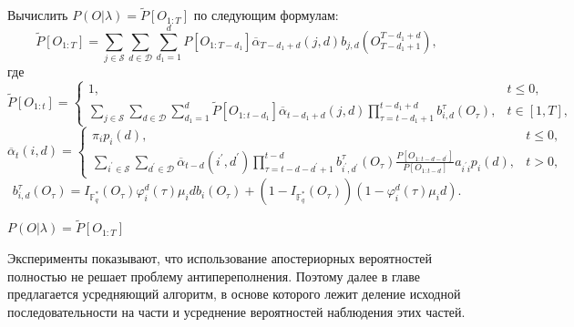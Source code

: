 \documentclass[twoside,12pt]{article}
\begin{document}
\begin{algorithm}[H]
\SetAlgoLined
\caption{${\mathrm{EvaluationProblemSolver}}$}

Вычислить $P(O|\lambda) = \widetilde{P}[O_{1:T}]$ по следующим формулам:
\begin{equation}\nonumber
\widetilde{P}[O_{1:T}]=\sum\limits_{j\in \mathcal{S}}\sum\limits_{d \in \mathcal{D}}\sum\limits_{d_1=1}^{d}P[O_{1:T-d_1}]\overline{\alpha}_{T-d_1+d}(j,d)b_{j,d}(O_{T-d_1+1}^{T-d_1+d}),
\end{equation}
где
\begin{equation}\nonumber
\widetilde{P}[O_{1:t}]=\left\{\begin{array}{ll}
1, &t\leq 0,\\\sum\limits_{j\in \mathcal{S}}\sum\limits_{d \in \mathcal{D}}\sum\limits_{d_1=1}^{d}\widetilde{P}[O_{1:t-d_1}]\overline{\alpha}_{t-d_1+d}(j,d)\prod\limits_{\tau=t-d_1+1}^{t-d_1+d} b_{i,d}^\tau(O_\tau),& t\in [1,T],\end{array}\right.
\end{equation}
\begin{equation}\nonumber
\overline{\alpha}_{t}(i,d)=\left\{
\begin{array}{ll}
\pi_i p_i(d), &t\leq 0,\\
\sum\limits_{i^\prime\in \mathcal{S}}\sum\limits_{d^\prime \in \mathcal{D}}\overline{\alpha}_{t-d}(i^\prime,d^\prime)
\prod\limits_{\tau=t-d-d^\prime+1}^{t-d}b_{i^\prime,d^\prime}^\tau(O_\tau)\frac{P[O_{1:t-d-d^\prime}]}{P[O_{1:t-d}]}
a_{i^\prime i} p_i(d), & t>0,
\end{array}\right.
\end{equation}
$$b_{i,d}^{\tau}(O_\tau) =I_{\mathbb{F}^{\ast}_q}(O_\tau)\varphi_i^d(\tau)\mu_idb_i(O_\tau)+(1-I_{\mathbb{F}^{\ast}_q}(O_\tau))(1-\varphi_i^d(\tau)\mu_id).$$

\KwRet $P(O|\lambda) = \widetilde{P}[O_{1:T}]$

\end{algorithm}

Эксперименты показывают, что использование апостериорных вероятностей полностью не решает проблему антипереполнения. Поэтому далее в главе предлагается усредняющий алгоритм, в основе которого лежит деление исходной последовательности на части и усреднение вероятностей наблюдения этих частей.
\end{document}

